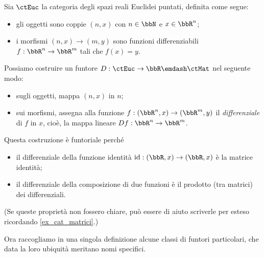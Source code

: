 \begin{example}\label{exa_derivata_funtore}
	Sia \(\ctEuc\) la categoria degli spazi reali Euclidei puntati, definita come segue:
	\begin{itemize}
		\item gli oggetti sono coppie \((n,x)\) con \(n\in\bbN\) e \(x\in\bbR^n\);
		\item i morfismi \((n,x)\to (m,y)\) sono funzioni differenziabili \(f:\bbR^n\to\bbR^m\) tali che \(f(x)=y\).
	\end{itemize}
	Possiamo costruire un funtore \(D:\ctEuc\to\bbR\emdash\ctMat\) nel seguente modo:
	\begin{itemize}
		\item sugli oggetti, mappa \((n,x)\) in \(n\);
		\item sui morfismi, assegna alla funzione \(f:(\bbR^n,x)\to (\bbR^m,y)\) il \emph{differenziale} di \(f\) in \(x\), cioè, la mappa lineare \(Df:\bbR^n\to\bbR^m\).
	\end{itemize}
	Questa costruzione è funtoriale perché
	\begin{itemize}
		\item il differenziale della funzione identità \(\id : (\bbR,x) \to (\bbR,x)\) è la matrice identità;
		\item il differenziale della composizione di due funzioni è il prodotto (tra matrici) dei differenziali.
	\end{itemize}
	(Se queste proprietà non fossero chiare, può essere di aiuto scriverle per esteso ricordando \ref{ex_cat_matrici}.)
\end{example}
Ora raccogliamo in una singola definizione alcune classi di funtori particolari, che data la loro ubiquità meritano nomi specifici.
